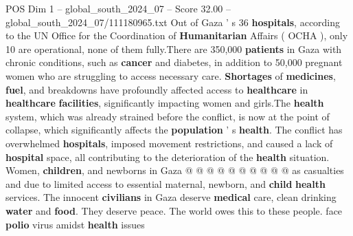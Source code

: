 \begin{textsample}{POS Dim 1 – global\_south\_2024\_07 – Score 32.00 – global\_south\_2024\_07/111180965.txt}
Out of Gaza ' s 36 \textbf{hospitals}, according to the UN Office for the Coordination of \textbf{Humanitarian} Affairs ( OCHA ), only 10 are operational, none of them fully.There are 350,000 \textbf{patients} in Gaza with chronic conditions, such as \textbf{cancer} and diabetes, in addition to 50,000 pregnant women who are struggling to access necessary care. \textbf{Shortages} of \textbf{medicines}, \textbf{fuel}, and breakdowns have profoundly affected access to \textbf{healthcare} in \textbf{healthcare} \textbf{facilities}, significantly impacting women and girls.The \textbf{health} system, which was already strained before the conflict, is now at the point of collapse, which significantly affects the \textbf{population} ' s \textbf{health}.
The conflict has overwhelmed \textbf{hospitals}, imposed movement restrictions, and caused a lack of \textbf{hospital} space, all contributing to the deterioration of the \textbf{health} situation.
Women, \textbf{children}, and newborns in Gaza @ @ @ @ @ @ @ @ @ @ as casualties and due to limited access to essential maternal, newborn, and \textbf{child} \textbf{health} services.
The innocent \textbf{civilians} in Gaza deserve \textbf{medical} care, clean drinking \textbf{water} and \textbf{food}.
They deserve peace.
The world owes this to these people. face \textbf{polio} virus amidst \textbf{health} issues

\end{textsample}
